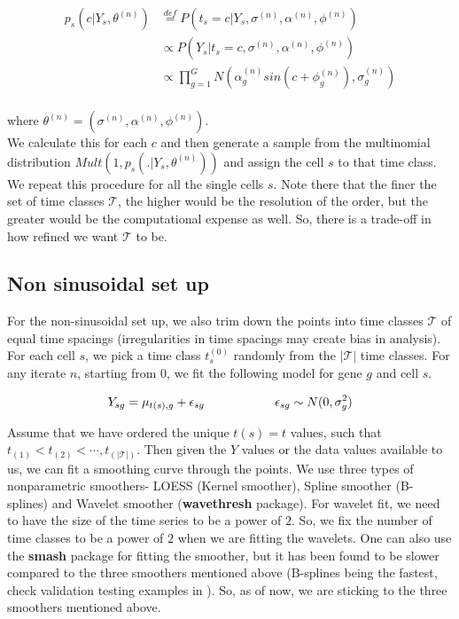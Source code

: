 \documentclass[11pt]{article}
\begin{document}
\begin{align*}
p_s (c | Y_s, \theta^{(n)})  & \stackrel{def}{=} P \left (t_s = c |  Y_s, \sigma^{(n)}, \alpha^{(n)}, \phi^{(n)} \right )  \\
					& \propto P(Y_s | t_s =c,  \sigma^{(n)}, \alpha^{(n)}, \phi^{(n)}) \\
				        & \propto  \prod_{g=1}^{G} N \left ( \alpha^{(n)}_g sin (c + \phi^{(n)}_g), \sigma^{(n)}_{g} \right ) \\
\end{align*}

where $\theta^{(n)} = \left (\sigma^{(n)}, \alpha^{(n)}, \phi^{(n)} \right )$. \\[2 pt]

We calculate this for each $c$ and then generate a sample from the multinomial distribution $ Mult \left (1, p_s (. | Y_s, \theta^{(n)}) \right)$ and assign the cell $s$ to that time class. We repeat this procedure for all the single cells $s$. Note there that the finer the set of time classes $\mathcal{T}$, the higher would be the resolution of the order, but the greater would be the computational expense as well. So, there is a trade-off in how refined we want $\mathcal{T}$ to be.

\subsection{Non sinusoidal set up}

For the non-sinusoidal set up, we also trim down the points into time classes $\mathcal{T}$ of equal time spacings (irregularities in time spacings may create bias in analysis).  For each cell $s$, we pick a time class $t^{(0)}_{s}$ randomly from the $ \left | \mathcal{T} \right | $ time classes. For any iterate $n$, starting from $0$,  we fit the following model for gene $g$ and cell $s$.

$$ Y_{sg} = \mu_{t(s),g} + \epsilon_{sg}  \hspace{2 cm} \epsilon_{sg} \sim N(0, \sigma^2_{g}) $$

Assume that we have ordered the unique $t(s) = t$ values, such that $t_{(1)} < t_{(2)} < \cdots, t_{(|\mathcal{T}|)}$.  Then given the $Y$ values or the data values available to us, we can fit a smoothing curve through the points. We use three types of nonparametric smoothers- LOESS (Kernel smoother), Spline smoother (B-splines) and Wavelet smoother (\textbf{wavethresh} package).  For wavelet fit, we need to have the size of the time series to be a power of $2$. So, we fix the number of time classes to be a power of $2$ when we are fitting the wavelets. One can also use the \textbf{smash} package for fitting the smoother, but it has been found to be slower compared to the three smoothers mentioned above (B-splines being the fastest, check validation testing examples in ). So, as of now, we are sticking to the three smoothers mentioned above.
\end{document}
